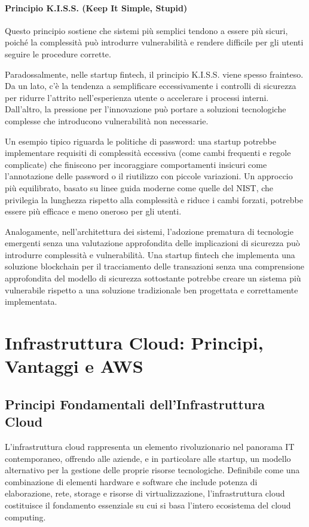 \documentclass[a4paper,12pt]{report}
\begin{document}
\subsubsection{Principio K.I.S.S. (Keep It Simple, Stupid)}

Questo principio sostiene che sistemi più semplici tendono a essere più sicuri, poiché la complessità può introdurre vulnerabilità e rendere difficile per gli utenti seguire le procedure corrette.

Paradossalmente, nelle startup fintech, il principio K.I.S.S. viene spesso frainteso. Da un lato, c'è la tendenza a semplificare eccessivamente i controlli di sicurezza per ridurre l'attrito nell'esperienza utente o accelerare i processi interni. Dall'altro, la pressione per l'innovazione può portare a soluzioni tecnologiche complesse che introducono vulnerabilità non necessarie.

Un esempio tipico riguarda le politiche di password: una startup potrebbe implementare requisiti di complessità eccessiva (come cambi frequenti e regole complicate) che finiscono per incoraggiare comportamenti insicuri come l'annotazione delle password o il riutilizzo con piccole variazioni. Un approccio più equilibrato, basato su linee guida moderne come quelle del NIST, che privilegia la lunghezza rispetto alla complessità e riduce i cambi forzati, potrebbe essere più efficace e meno oneroso per gli utenti.

Analogamente, nell'architettura dei sistemi, l'adozione prematura di tecnologie emergenti senza una valutazione approfondita delle implicazioni di sicurezza può introdurre complessità e vulnerabilità. Una startup fintech che implementa una soluzione blockchain per il tracciamento delle transazioni senza una comprensione approfondita del modello di sicurezza sottostante potrebbe creare un sistema più vulnerabile rispetto a una soluzione tradizionale ben progettata e correttamente implementata.


\chapter{Infrastruttura Cloud: Principi, Vantaggi e AWS}

\section{Principi Fondamentali dell'Infrastruttura Cloud}

L'infrastruttura cloud rappresenta un elemento rivoluzionario nel panorama IT contemporaneo, offrendo alle aziende, e in particolare alle startup, un modello alternativo per la gestione delle proprie risorse tecnologiche. Definibile come una combinazione di elementi hardware e software che include potenza di elaborazione, rete, storage e risorse di virtualizzazione, l'infrastruttura cloud costituisce il fondamento essenziale su cui si basa l'intero ecosistema del cloud computing.
\end{document}
